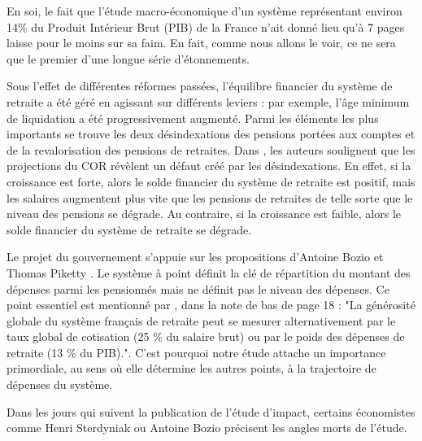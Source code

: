 \documentclass[10pt]{article}
\begin{document}
En soi, le fait que l'étude macro-économique d'un système représentant environ 14\% 
du Produit Intérieur Brut (PIB) de la France n'ait donné lieu qu'à 7 pages laisse pour le 
moins sur sa faim. 
En fait, comme nous allons le voir, ce ne sera que le premier d'une longue 
série d'étonnements. 

Sous l'effet de différentes réformes passées, l'équilibre financier du système 
de retraite a été géré en agissant sur différents 
leviers : par exemple, l'âge minimum de liquidation a été progressivement augmenté. 
Parmi les éléments les plus importants se trouve les deux désindexations 
des pensions portées aux comptes et de la revalorisation des pensions de retraites. 
Dans \cite{Gannon2019}, les auteurs soulignent que les 
projections du COR révèlent un défaut créé par les désindexations. 
En effet, si la croissance est forte, alors le solde financier 
du système de retraite est positif, mais les salaires augmentent plus vite que 
les pensions de retraites de telle sorte que le niveau des pensions se dégrade. 
Au contraire, si la croissance est faible, alors le solde financier du système 
de retraite se dégrade. 

Le projet du gouvernement s'appuie sur les propositions d'Antoine 
Bozio et Thomas Piketty \cite{Bozio2008}. 
Le système à point définit la clé de répartition du montant des dépenses 
parmi les pensionnés mais ne définit pas le niveau des dépenses. 
Ce point essentiel est mentionné par \cite{Bozio2008}, dans la note de 
bas de page 18 : "La générosité globale du système français de retraite 
peut se mesurer alternativement par le taux global de cotisation (25 \% du salaire brut) 
ou par le poids des dépenses de retraite (13 \% du PIB).". 
C'est pourquoi notre étude attache un importance primordiale, au sens où elle 
détermine les autres points, à la trajectoire de dépenses du système. 


Dans les jours qui suivent la publication de l'étude d'impact, 
certains économistes comme Henri Sterdyniak \cite{Sterdyniak2020} ou 
Antoine Bozio \cite{Bozio2020} précisent les angles morts de l'étude. 
\end{document}
